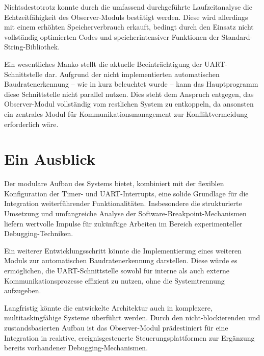 Nichtsdestotrotz konnte durch die umfassend durchgef\"uhrte Laufzeitanalyse die Echtzeitf\"ahigkeit des Observer-Moduls best\"atigt werden. Diese wird allerdings mit einem erh\"ohten Speicherverbrauch erkauft, bedingt durch den Einsatz nicht vollst\"andig optimierten Codes und speicherintensiver Funktionen der Standard-String-Bibliothek.

Ein wesentliches Manko stellt die aktuelle Beeintr\"achtigung der UART-Schnittstelle dar. Aufgrund der nicht implementierten automatischen Baudratenerkennung -- wie in  kurz beleuchtet wurde -- kann das Hauptprogramm diese Schnittstelle nicht parallel nutzen. Dies steht dem Anspruch entgegen, das Observer-Modul vollst\"andig vom restlichen System zu entkoppeln, da ansonsten ein zentrales Modul f\"ur Kommunikationsmanagement zur Konfliktvermeidung erforderlich w\"are.\AI


\newpage
\section{Ein Ausblick}
\label{sec:EinAusblick}

Der modulare Aufbau des Systems bietet, kombiniert mit der flexiblen Konfiguration der Timer- und UART-Interrupts, eine solide Grundlage f\"ur die Integration weiterf\"uhrender Funktionalit\"aten. Insbesondere die strukturierte Umsetzung und umfangreiche Analyse der Software-Breakpoint-Mechanismen liefern wertvolle Impulse f\"ur zuk\"unftige Arbeiten im Bereich experimenteller Debugging-Techniken.

Ein weiterer Entwicklungsschritt k\"onnte die Implementierung eines weiteren Moduls zur automatischen Baudratenerkennung darstellen. Diese w\"urde es erm\"oglichen, die UART-Schnittstelle sowohl f\"ur interne als auch externe Kommunikationsprozesse effizient zu nutzen, ohne die Systemtrennung aufzugeben. 

Langfristig k\"onnte die entwickelte Architektur auch in komplexere, multitaskingf\"ahige Systeme \"uberf\"uhrt werden. Durch den nicht-blockierenden und zustandsbasierten Aufbau ist das Observer-Modul pr\"adestiniert f\"ur eine Integration in reaktive, ereignisgesteuerte Steuerungsplattformen zur Erg\"anzung bereits vorhandener Debugging-Mechanismen.